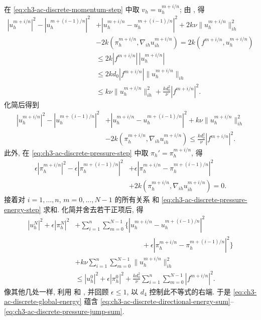 \hypertarget{chapter-03-page-317}{}
\begin{Proof}
在 \eqref{eq:ch3-ac-discrete-momentum-step} 中取 $v_h=u_h^{m+i/n}$; 由 , 得
\begin{equation}
\begin{aligned}
|u_h^{m+i/n}|^2-|u_h^{m+(i-1)/n}|^2
&+|u_h^{m+i/n}-u_h^{m+(i-1)/n}|^2
+2k\nu\lVert u_h^{m+i/n}\rVert_{ih}^2\\
&-2k(\pi_h^{m+i/n},\nabla_{ih}u_{ih}^{m+i/n})
=2k(f^{m+i/n},u_h^{m+i/n})\\
&\leq2k|f^{m+i/n}|\,|u_h^{m+i/n}|\\
&\leq2kd_0|f^{m+i/n}|\lVert u_h^{m+i/n}\rVert_{ih}\\
&\leq k\nu\lVert u_h^{m+i/n}\rVert_{ih}^2
+\frac{kd_0^2}{\nu}|f^{m+i/n}|^2.
\end{aligned}
\label{eq:ch3-ac-discrete-energy-step-before-simplification}
\end{equation}
化简后得到
\begin{equation}
\begin{aligned}
|u_h^{m+i/n}|^2-|u_h^{m+(i-1)/n}|^2
&+|u_h^{m+i/n}-u_h^{m+(i-1)/n}|^2
+k\nu\lVert u_h^{m+i/n}\rVert_{ih}^2\\
&-2k(\pi_h^{m+i/n},\nabla_{ih}u_{ih}^{m+i/n})
\leq\frac{kd_0^2}{\nu}|f^{m+i/n}|^2.
\end{aligned}
\label{eq:ch3-ac-discrete-energy-step}
\end{equation}
此外, 在 \eqref{eq:ch3-ac-discrete-pressure-step} 中取 $\pi_h'=\pi_h^{m+i/n}$, 得
\begin{equation}
\begin{aligned}
\epsilon|\pi_h^{m+i/n}|^2
-\epsilon|\pi_h^{m+(i-1)/n}|^2
&+\epsilon|\pi_h^{m+i/n}-\pi_h^{m+(i-1)/n}|^2\\
&+2k(\pi_h^{m+i/n},\nabla_{ih}u_{ih}^{m+i/n})=0.
\end{aligned}
\label{eq:ch3-ac-discrete-pressure-energy-step}
\end{equation}
接着对 $i=1,\ldots,n$, $m=0,\ldots,N-1$ 的所有关系  和 \eqref{eq:ch3-ac-discrete-pressure-energy-step} 求和. 化简并舍去若干正项后, 得
\begin{equation}
\begin{aligned}
|u_h^N|^2+\epsilon|\pi_h^N|^2
&+\sum_{i=1}^n\sum_{m=0}^{N-1}
\bigl\{|u_h^{m+i/n}-u_h^{m+(i-1)/n}|^2\\
&\hspace{4cm}+\epsilon|\pi_h^{m+i/n}-\pi_h^{m+(i-1)/n}|^2\bigr\}\\
&+k\nu\sum_{i=1}^n\sum_{m=0}^{N-1}
\lVert u_h^{m+i/n}\rVert_{ih}^2\\
&\leq|u_h^0|^2+\epsilon|\pi_h^0|^2
+\frac{kd_0^2}{\nu}\sum_{i=1}^n\sum_{m=0}^{N-1}|f^{m+i/n}|^2.
\end{aligned}
\label{eq:ch3-ac-discrete-global-energy}
\end{equation}
像其他几处一样, 利用  和 , 并回顾 $\epsilon\leq1$, 以 $d_4$ 控制此不等式的右端. 于是 \eqref{eq:ch3-ac-discrete-global-energy} 蕴含 \eqref{eq:ch3-ac-discrete-directional-energy-sum}--\eqref{eq:ch3-ac-discrete-pressure-jump-sum}.


\end{Proof}
